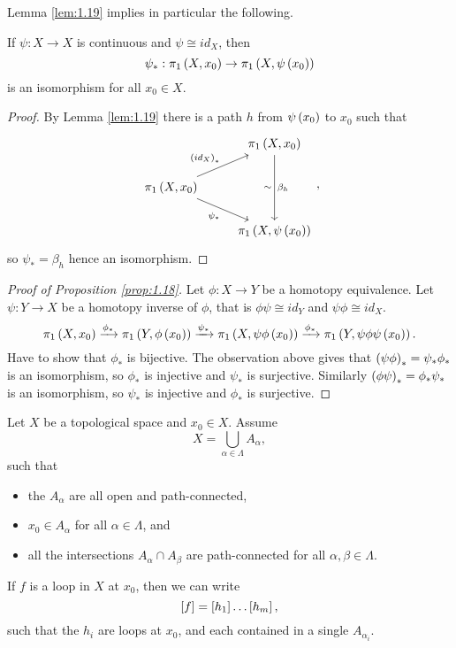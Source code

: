 Lemma \ref{lem:1.19} implies in particular the following.

\begin{corollary}
If $ \psi : X \to X $ is continuous and $ \psi \cong id_X $, then
$$ \psi_* : \pi_1\rb{X, x_0} \to \pi_1\rb{X, \psi\rb{x_0}} $$
is an isomorphism for all $ x_0 \in X $.
\end{corollary}

\begin{proof}
By Lemma \ref{lem:1.19} there is a path $ h $ from $ \psi\rb{x_0} $ to $ x_0 $ such that
$$
\begin{tikzcd}
& \pi_1\rb{X, x_0} \arrow{dd}{\beta_h}[swap]{\sim} \\
\pi_1\rb{X, x_0} \arrow{ur}{\rb{id_X}_*} \arrow[swap]{dr}{\psi_*} & \\
& \pi_1\rb{X, \psi\rb{x_0}}
\end{tikzcd},
$$
so $ \psi_* = \beta_h $ hence an isomorphism.
\end{proof}

\begin{proof}[Proof of Proposition \ref{prop:1.18}]
Let $ \phi : X \to Y $ be a homotopy equivalence. Let $ \psi : Y \to X $ be a homotopy inverse of $ \phi $, that is $ \phi\psi \cong id_Y $ and $ \psi\phi \cong id_X $.
$$ \pi_1\rb{X, x_0} \xrightarrow{\phi_*} \pi_1\rb{Y, \phi\rb{x_0}} \xrightarrow{\psi_*} \pi_1\rb{X, \psi\phi\rb{x_0}} \xrightarrow{\phi_*} \pi_1\rb{Y, \psi\phi\psi\rb{x_0}}. $$
Have to show that $ \phi_* $ is bijective. The observation above gives that $ \rb{\psi\phi}_* = \psi_*\phi_* $ is an isomorphism, so $ \phi_* $ is injective and $ \psi_* $ is surjective. Similarly $ \rb{\phi\psi}_* = \phi_*\psi_* $ is an isomorphism, so $ \psi_* $ is injective and $ \phi_* $ is surjective.
\end{proof}

\begin{lemma}
\label{lem:1.15}
Let $ X $ be a topological space and $ x_0 \in X $. Assume
$$ X = \bigcup_{\alpha \in \Lambda} A_\alpha, $$
such that
\begin{itemize}
\item the $ A_\alpha $ are all open and path-connected,
\item $ x_0 \in A_\alpha $ for all $ \alpha \in \Lambda $, and
\item all the intersections $ A_\alpha \cap A_\beta $ are path-connected for all $ \alpha, \beta \in \Lambda $.
\end{itemize}
If $ f $ is a loop in $ X $ at $ x_0 $, then we can write
$$ \sb{f} = \sb{h_1} \dots \sb{h_m}, $$
such that the $ h_i $ are loops at $ x_0 $, and each contained in a single $ A_{\alpha_i} $.
\end{lemma}

